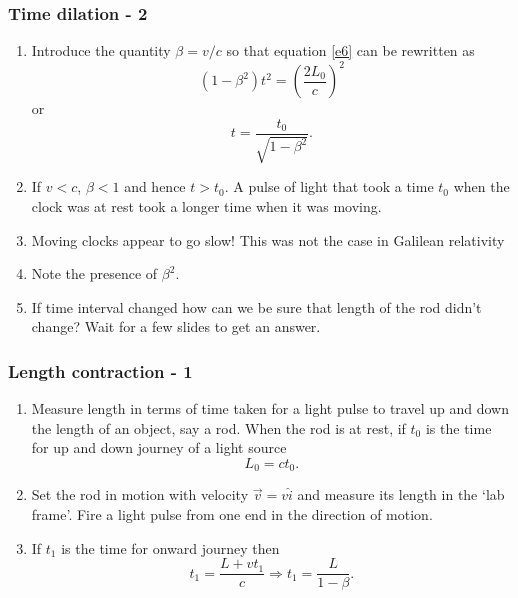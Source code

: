 \documentclass{beamer}
\begin{document}
\begin{frame}
\frametitle{Time dilation - 2}
\begin{enumerate}
\item Introduce the quantity $\beta = v/c$ so that equation \eqref{e6} can be
rewritten as
\[
(1 - \beta^2)t^2 = \left(\frac{2L_0}{c}\right)^2 
\]
or
\begin{equation}\label{e7}
t = \frac{t_0}{\sqrt{1 - \beta^2}}.
\end{equation}
\item If $v < c$, $\beta < 1$ and hence $t > t_0$. A pulse of light that took
 a time $t_0$ when the clock was at rest took a longer time when it was moving.
\item Moving clocks appear to go slow! This was not the case in Galilean
relativity
\item Note the presence of $\beta^2$.
\item If time interval changed how can we be sure that length of the rod didn't
change? Wait for a few slides to get an answer. 
\end{enumerate}
\end{frame}

\begin{frame}
\frametitle{Length contraction - 1}
\begin{enumerate}
\item Measure length in terms of time taken for a light pulse to travel up and
down the length of an object, say a rod. When the rod is at rest, if $t_0$ is
the time for up and down journey of a light source 
\begin{equation}\label{e8}
L_0 = ct_0.
\end{equation}
\item Set the rod in motion with velocity $\vec{v} = v\hat{i}$ and measure its
length in the `lab frame'. Fire a light pulse from one end in the direction of
motion.
\item If $t_1$ is the time for onward journey then
\begin{equation}\label{e9}
t_1 = \frac{L + vt_1}{c} \Rightarrow t_1 = \frac{L}{1 - \beta}.
\end{equation}
\end{enumerate}
\end{frame}
\end{document}

